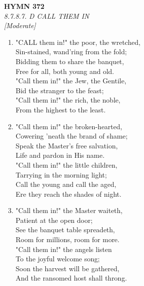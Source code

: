 \documentclass[11pt,a4paper]{article}
\begin{document}
\newpage
\begin{center}
    {\Large \textbf{HYMN 372}}
    \\
    \textit{8.7.8.7. D CALL THEM IN}
    \\
    \textit{\small [Moderate]}
\end{center}
\vspace{1em}

\begin{enumerate}
    \item "CALL them in!" the poor, the wretched, \\
        Sin-stained, wand'ring from the fold; \\
        Bidding them to share the banquet, \\
        Free for all, both young and old. \\
        "Call them in!" the Jew, the Gentile, \\
        Bid the stranger to the feast; \\
        "Call them in!" the rich, the noble, \\
        From the highest to the least.

    \item "Call them in!" the broken-hearted, \\
        Cowering 'neath the brand of shame; \\
        Speak the Master's free salvation, \\
        Life and pardon in His name. \\
        "Call them in!" the little children, \\
        Tarrying in the morning light; \\
        Call the young and call the aged, \\
        Ere they reach the shades of night.

    \item "Call them in!" the Master waiteth, \\
        Patient at the open door; \\
        See the banquet table spreadeth, \\
        Room for millions, room for more. \\
        "Call them in!" the angels listen \\
        To the joyful welcome song; \\
        Soon the harvest will be gathered, \\
        And the ransomed host shall throng.

\end{enumerate}
\end{document}

